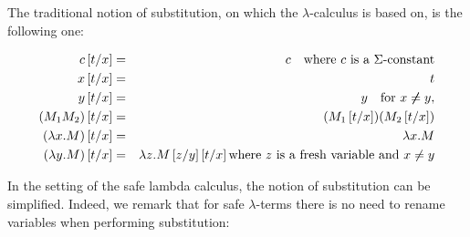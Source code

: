 The traditional notion of substitution, on which the
$\lambda$-calculus is based on, is the following one:
\begin{dfn}[Substitution]
\label{dfn:subst}
\begin{eqnarray*}
c \left[ t/x \right] &=& c \quad \mbox{where $c$ is a $\Sigma$-constant}\\
x \left[ t/x \right] &=& t\\
 y\left[ t/x \right] &=& y \quad \mbox{for } x \not \neq y,\\
(M_1 M_2) \left[ t/x \right] &=& (M_1 \left[ t/x \right]) (M_2 \left[ t/x \right])\\
(\lambda x . M) \left[ t/x \right] &=& \lambda x . M\\
(\lambda y . M) \left[ t/x \right] &=& \lambda z . M \left[ z/y \right]
\left[ t/x \right] \mbox{where $z$ is a fresh variable and $x\not = y$}
\end{eqnarray*}
\end{dfn}

In the setting of the safe lambda calculus, the notion of
substitution can be simplified. Indeed, we remark that for safe
$\lambda$-terms there is no need to rename variables when performing
substitution:

